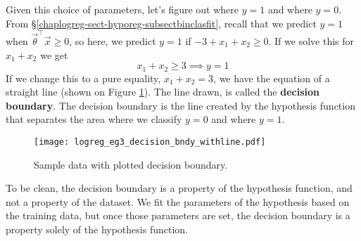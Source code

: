 Given this choice of parameters, let's figure out where $y=1$ and where $y=0$. From \S\ref{chaplogreg-sect-hyporeg-subsectbinclasfit}, recall that we predict $y=1$ when $\vec{\theta}^\intercal\vec{x} \geq 0$, so here, we predict $y=1$ if $-3 + x_1 + x_2 \geq 0$. If we solve this for $x_1 + x_2$ we get
$$
x_1 + x_2 \geq 3 \implies y = 1
$$
If we change this to a pure equality, $x_1 + x_2 = 3$, we have the equation of a straight line (shown on Figure \ref{logreg_eg3_decision_bndy_withline.pdf}). The line drawn, is called the \textbf{decision boundary}. The decision boundary is the line created by the hypothesis function that separates the area where we classify $y=0$ and where $y=1$.

\begin{figure}[h] %
	\centering
	\graphicspath{{./Figures/}} %
	\texttt{[image: logreg\_eg3\_decision\_bndy\_withline.pdf]} 
	\caption[]{Sample data with plotted decision boundary.}
	\label{logreg_eg3_decision_bndy_withline.pdf}
\end{figure}

To be clean, the decision boundary is a property of the hypothesis function, and not a property of the dataset. We fit the parameters of the hypothesis based on the training data, but once those parameters are set, the decision boundary is a property solely of the hypothesis function. 

